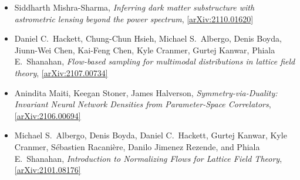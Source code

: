 \begin{itemize}
\item Siddharth Mishra-Sharma, \textit{Inferring dark matter substructure with astrometric lensing beyond the power spectrum}, \href{https://arxiv.org/abs/2110.01620}{[arXiv:2110.01620]} 
\item Daniel C.\  Hackett, Chung-Chun Hsieh, Michael S.\  Albergo, Denis Boyda, Jiunn-Wei Chen, Kai-Feng Chen, Kyle Cranmer, Gurtej Kanwar, Phiala E.\  Shanahan, \textit{Flow-based sampling for multimodal distributions in lattice field theory}, \href{https://arxiv.org/abs/2107.00734}{[arXiv:2107.00734]} 
\item Anindita Maiti, Keegan Stoner, James Halverson, \textit{Symmetry-via-Duality: Invariant Neural Network Densities from Parameter-Space Correlators}, \href{https://arxiv.org/abs/2106.00694}{[arXiv:2106.00694]} 
\item Michael S.\  Albergo, Denis Boyda, Daniel C.\  Hackett, Gurtej Kanwar, Kyle Cranmer, Sébastien Racanière, Danilo Jimenez Rezende, and Phiala E.\  Shanahan, \textit{Introduction to Normalizing Flows for Lattice Field Theory}, \href{https://arxiv.org/abs/2101.08176}{[arXiv:2101.08176]} 
\end{itemize}